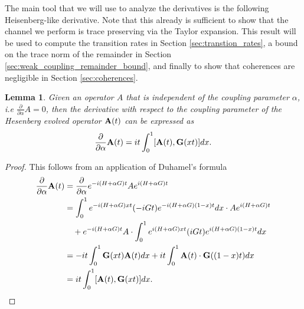 \documentclass[
 amsmath,amssymb,
 aps,
onecolumn, 
nofootinbib]{revtex4-2}
\newtheorem{lemma}[theorem]{Lemma}
\begin{document}
The main tool that we will use to analyze the derivatives is the following Heisenberg-like derivative. Note that this already is sufficient to show that the channel we perform is trace preserving via the Taylor expansion. This result will be used to compute the transition rates in Section \ref{sec:transtion_rates}, a bound on the trace norm of the remainder in Section \ref{sec:weak_coupling_remainder_bound}, and finally to show that coherences are negligible in Section \ref{sec:coherences}.
\begin{lemma}
    Given an operator $A$ that is independent of the coupling parameter $\alpha$, i.e $\frac{\partial}{\partial \alpha} A = 0$, then the derivative with respect to the coupling parameter of the Hesenberg evolved operator $\bold{A}(t)$ can be expressed as
    \begin{equation}
        \frac{\partial}{\partial \alpha} \bold{A}(t) = i t \int_0^1 [\bold{A}(t), \bold{G}(x t)] dx.
    \end{equation}
\end{lemma} \label{lem:heisenberg_derivative}
\begin{proof}
    This follows from an application of Duhamel's formula
    \begin{align}
        \frac{\partial}{\partial \alpha} \bold{A}(t) &= \frac{\partial }{\partial \alpha} e^{-i (H + \alpha G ) t} A e^{i (H + \alpha G) t} \\
        &= \int_0^1 e^{-i (H + \alpha G) x t} (-i G t) e^{-i (H + \alpha G)(1 - x) t} dx \cdot A e^{i (H + \alpha G)t} \\
        &\quad+ e^{-i (H + \alpha G)t} A \cdot \int_0^1 e^{i (H + \alpha G) x t} (i G t) e^{i (H + \alpha G) (1- x) t} d x \\
        &= -i t\int_0^1 \bold{G}(x t) \bold{A}(t) d x + it \int_0^1 \bold{A}(t) \cdot \bold{G}((1 - x)t) d x \\
        &= i t \int_0^1 [\bold{A}(t) , \bold{G}(x t)] dx.
    \end{align}
\end{proof}
\end{document}
